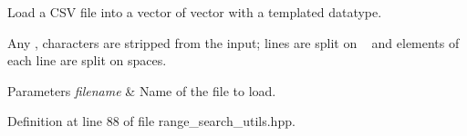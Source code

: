 Load a C\+SV file into a vector of vector with a templated datatype. 

Any \textquotesingle{},\textquotesingle{} characters are stripped from the input; lines are split on \textquotesingle{}~\newline
\textquotesingle{} and elements of each line are split on spaces.


\begin{DoxyParams}{Parameters}
{\em filename} & Name of the file to load. \\
\hline
\end{DoxyParams}


Definition at line 88 of file range\+\_\+search\+\_\+utils.\+hpp.

